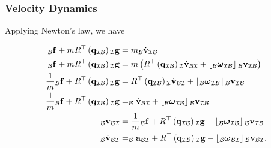 \documentclass{beamer}
\begin{document}
\begin{frame}
\frametitle{Velocity Dynamics}
Applying Newton's law, we have

\begin{align}
_{\mathcal{B}}{\bf f}+mR^{\top}\left({\bf q}_{\mathcal{I}\mathcal{B}}\right){}_{\mathcal{I}}{\bf g} & =m_{\mathcal{B}}\dot{{\bf v}}_{\mathcal{I}\mathcal{B}}\\
_{\mathcal{B}}{\bf f}+mR^{\top}\left({\bf q}_{\mathcal{I}\mathcal{B}}\right){}_{\mathcal{I}}{\bf g} & =m\left(R^{\top}\left({\bf q}_{\mathcal{I}\mathcal{B}}\right){}_{\mathcal{I}}\dot{{\bf v}}_{\mathcal{B}\mathcal{I}}+\left\lfloor _{\mathcal{B}}\boldsymbol{\omega}_{\mathcal{I}\mathcal{B}}\right\rfloor {}_{\mathcal{B}}{\bf v}_{\mathcal{I}\mathcal{B}}\right)\\
\frac{1}{m}{}_{\mathcal{B}}{\bf f}+R^{\top}\left({\bf q}_{\mathcal{I}\mathcal{B}}\right){}_{\mathcal{I}}{\bf g} & =R^{\top}\left({\bf q}_{\mathcal{I}\mathcal{B}}\right){}_{\mathcal{I}}\dot{{\bf v}}_{\mathcal{B}\mathcal{I}}+\left\lfloor _{\mathcal{B}}\boldsymbol{\omega}_{\mathcal{I}\mathcal{B}}\right\rfloor {}_{\mathcal{B}}{\bf v}_{\mathcal{I}\mathcal{B}}\\
\frac{1}{m}{}_{\mathcal{B}}{\bf f}+R^{\top}\left({\bf q}_{\mathcal{I}\mathcal{B}}\right){}_{\mathcal{I}}{\bf g} & =_{\mathcal{B}}\dot{{\bf v}}_{\mathcal{B}\mathcal{I}}+\left\lfloor _{\mathcal{B}}\boldsymbol{\omega}_{\mathcal{I}\mathcal{B}}\right\rfloor {}_{\mathcal{B}}{\bf v}_{\mathcal{I}\mathcal{B}}\\
_{\mathcal{B}}\dot{{\bf v}}_{\mathcal{B}\mathcal{I}} & =\frac{1}{m}{}_{\mathcal{B}}{\bf f}+R^{\top}\left({\bf q}_{\mathcal{I}\mathcal{B}}\right){}_{\mathcal{I}}{\bf g}-\left\lfloor _{\mathcal{B}}\boldsymbol{\omega}_{\mathcal{I}\mathcal{B}}\right\rfloor {}_{\mathcal{B}}{\bf v}_{\mathcal{I}\mathcal{B}}\\
_{\mathcal{B}}\dot{{\bf v}}_{\mathcal{B}\mathcal{I}} & =_{\mathcal{B}}{\bf a}_{\mathcal{B}\mathcal{I}}+R^{\top}\left({\bf q}_{\mathcal{I}\mathcal{B}}\right){}_{\mathcal{I}}{\bf g}-\left\lfloor _{\mathcal{B}}\boldsymbol{\omega}_{\mathcal{B}\mathcal{I}}\right\rfloor {}_{\mathcal{B}}{\bf v}_{\mathcal{B}\mathcal{I}}.
\end{align}
\end{frame}
\end{document}
